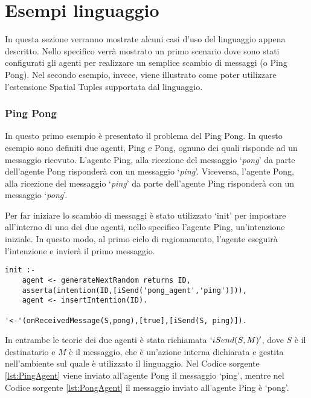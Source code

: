 \section{Esempi linguaggio}
In questa sezione verranno mostrate alcuni casi d'uso del linguaggio appena descritto. Nello specifico verrà mostrato un primo scenario dove sono stati configurati gli agenti per realizzare un semplice scambio di messaggi (o Ping Pong). Nel secondo esempio, invece, viene illustrato come poter utilizzare l'estensione Spatial Tuples supportata dal linguaggio.

\subsubsection{Ping Pong}
In questo primo esempio è presentato il problema del Ping Pong. In questo esempio sono definiti due agenti, Ping e Pong, ognuno dei quali risponde ad un messaggio ricevuto. L'agente Ping, alla ricezione del messaggio `\textit{pong}' da parte dell'agente Pong risponderà con un messaggio `\textit{ping}'. Viceversa, l'agente Pong, alla ricezione del messaggio `\textit{ping}' da parte dell'agente Ping risponderà con un messaggio `\textit{pong}'.

Per far iniziare lo scambio di messaggi è stato utilizzato `init' per impostare all'interno di uno dei due agenti, nello specifico l'agente Ping, un'intenzione iniziale. In questo modo, al primo ciclo di ragionamento, l'agente eseguirà l'intenzione e invierà il primo messaggio.
\lstset{
  basicstyle=\ttfamily,
  captionpos=b,
  frame=tb,
}
\medskip
\begin{lstlisting}[firstnumber=1,label={lst:PingAgent},caption={Agente Ping}]
init :-
    agent <- generateNextRandom returns ID,
    asserta(intention(ID,[iSend('pong_agent','ping')])),
    agent <- insertIntention(ID).

'<-'(onReceivedMessage(S,pong),[true],[iSend(S, ping)]).
\end{lstlisting}

In entrambe le teorie dei due agenti è stata richiamata $`iSend(S, M)'$, dove $S$ è il destinatario e $M$ è il messaggio, che è un'azione interna dichiarata e gestita nell'ambiente sul quale è utilizzato il linguaggio. Nel Codice sorgente \ref{lst:PingAgent} viene inviato all'agente Pong il messaggio `ping', mentre nel Codice sorgente \ref{lst:PongAgent} il messaggio inviato all'agente Ping è `pong'.

